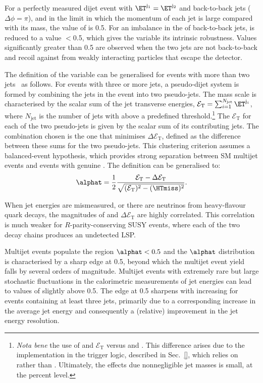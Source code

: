 For a perfectly measured dijet event with $\ET^{\mathrm{j_1}} =
\ET^{\mathrm{j_2}}$ and back-to-back jets ($\Delta\phi = \pi$), and in
the limit in which the momentum of each jet is large compared with its
mass, the value of \alphat is 0.5. For an imbalance in the \ET of
back-to-back jets, \alphat is reduced to a value $<$0.5, which gives
the variable its intrinsic robustness. Values significantly greater
than 0.5 are observed when the two jets are not back-to-back and
recoil against \ptvecmiss from weakly interacting particles that
escape the detector.

\newcommand{\scalst}{\ensuremath{\mathcal{E}_\mathrm{T}}\xspace}
\newcommand{\dst}{\ensuremath{\Delta\scalst}\xspace}

The definition of the \alphat variable can be generalised for events
with more than two jets~\cite{RA1Paper} as follows. For events with
three or more jets, a pseudo-dijet system is formed by combining the
jets in the event into two pseudo-jets. The mass scale is
characterised by the scalar sum of the jet transverse energies,
$\scalst = \sum_{i=1}^{N_\text{jet}} \ET^{\mathrm{j}_i}$, where
$N_\text{jet}$ is the number of jets with \ET above a predefined
threshold.\footnote{{\it Nota bene} the use of \Et and \scalst versus
  \Pt and \scalht. This difference arises due to the implementation in
  the trigger logic, described in Sec.~\ref{}, which relies on \Et
  rather than \Pt. Ultimately, the effects due nonnegligible jet
  masses is small, at the percent level.} The \scalst for each of the
two pseudo-jets is given by the scalar \ET sum of its contributing
jets. The combination chosen is the one that minimises \dst, defined
as the difference between these sums for the two pseudo-jets.  This
clustering criterion assumes a balanced-event hypothesis, which
provides strong separation between SM multijet events and events with
genuine \ptvecmiss. The \alphat definition can be generalised to:
\begin{equation}
  \label{eq:alphat}
  \alphat = \frac{1}{2} \frac{\scalst -
    \dst}{\sqrt{(\scalst)^2 - (\HTmiss)^2}}.
\end{equation}

When jet energies are mismeasured, or there are neutrinos from
heavy-flavour quark decays, the magnitudes of \HTmiss and \dst are
highly correlated. This correlation is much weaker for
$R$-parity-conserving SUSY events, where each of the two decay chains
produces an undetected LSP.

Multijet events populate the region $\alphat< 0.5$ and the $\alphat$
distribution is characterised by a sharp edge at 0.5, beyond which the
multijet event yield falls by several orders of magnitude. Multijet
events with extremely rare but large stochastic fluctuations in the
calorimetric measurements of jet energies can lead to values of
\alphat slightly above 0.5. The edge at 0.5 sharpens with increasing
\scalht for events containing at least three jets, primarily due to a
corresponding increase in the average jet energy and consequently a
(relative) improvement in the jet energy resolution. 


